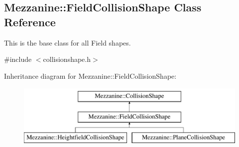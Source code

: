 \hypertarget{classMezzanine_1_1FieldCollisionShape}{
\subsection{Mezzanine::FieldCollisionShape Class Reference}
\label{classMezzanine_1_1FieldCollisionShape}
}


This is the base class for all Field shapes.  




{\ttfamily \#include $<$collisionshape.h$>$}

Inheritance diagram for Mezzanine::FieldCollisionShape:\begin{figure}[H]
\begin{center}
\leavevmode
\includegraphics[height=3.000000cm]{classMezzanine_1_1FieldCollisionShape}
\end{center}
\end{figure}
